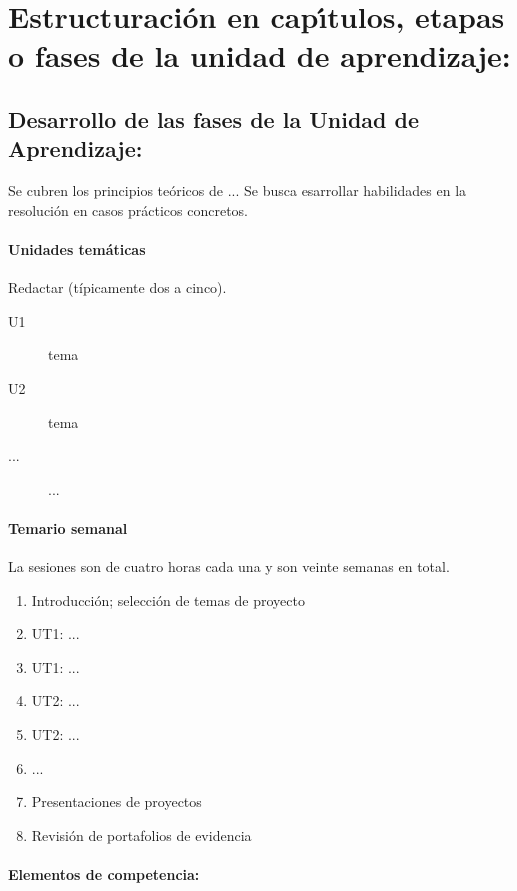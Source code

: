 \documentclass[10 pt]{article}
\begin{document}
\newpage
\section{Estructuraci\'{o}n en cap\'{\i}tulos, etapas o fases de la unidad de
  aprendizaje:}
\subsection{Desarrollo de las fases de la Unidad de Aprendizaje:}

Se cubren los principios te\'{o}ricos de ...
Se busca esarrollar habilidades en la resoluci\'{o}n en
casos pr\'{a}cticos concretos.

\paragraph{Unidades tem\'{a}ticas}

\quad

Redactar (t\'{i}picamente dos a cinco).

\begin{description}
\item[U1]{tema}
\item[U2]{tema}
\item[...]{...}
\end{description}

\paragraph{Temario semanal}

\quad

La sesiones son de cuatro horas cada una y son veinte
semanas en total.
\begin{enumerate}[itemsep=-3pt]
\item{Introducci\'{o}n; selecci\'{o}n de temas de proyecto}
\item{UT1: ...}
\item{UT1: ...}
\item{UT2: ...}
\item{UT2: ...}
\item{...}
\item{Presentaciones de proyectos}
\item{Revisi\'{o}n de portafolios de evidencia}
\end{enumerate}

\paragraph{Elementos de competencia:}
\end{document}
